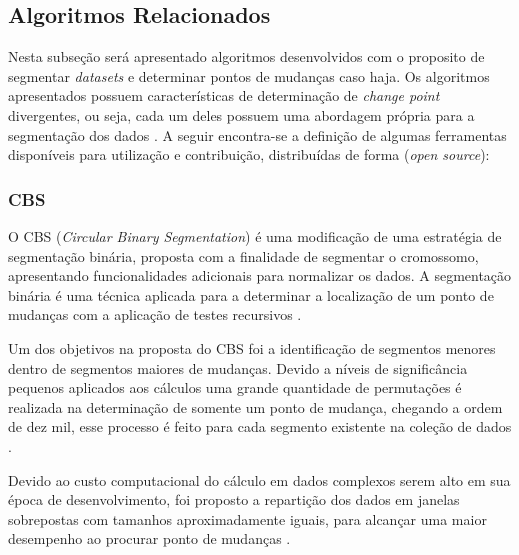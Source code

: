 
\subsection{Algoritmos Relacionados}

Nesta subseção será apresentado algoritmos desenvolvidos com o proposito de segmentar \textit{datasets} e determinar pontos de mudanças caso haja. Os algoritmos apresentados possuem características de determinação de \textit{change point} divergentes, ou seja, cada um deles possuem uma abordagem própria para a segmentação dos dados \cite{Aminikhanghahi2017}. A seguir encontra-se a definição de algumas ferramentas disponíveis para utilização e contribuição, distribuídas de forma (\textit{open source}):

\subsubsection{CBS}

O CBS (\textit{Circular Binary Segmentation}) é uma modificação de uma estratégia de segmentação binária, proposta com a finalidade de segmentar o cromossomo, apresentando funcionalidades adicionais para normalizar os dados. A segmentação binária é uma técnica aplicada para a determinar a localização de um ponto de mudanças com a aplicação de testes recursivos \cite{Olshen2004}.

Um dos objetivos na proposta do CBS foi a identificação de segmentos menores dentro de segmentos maiores de mudanças. Devido a níveis de significância pequenos aplicados aos cálculos uma grande quantidade de permutações é realizada na determinação de somente um ponto de mudança, chegando a ordem de dez mil, esse processo é feito para cada segmento existente na coleção de dados \cite{Olshen2004}.

Devido ao custo computacional do cálculo em dados complexos serem alto em sua época de desenvolvimento, foi proposto a repartição dos dados em janelas sobrepostas com tamanhos aproximadamente iguais, para alcançar uma maior desempenho ao procurar ponto de mudanças \cite{Olshen2004}.

